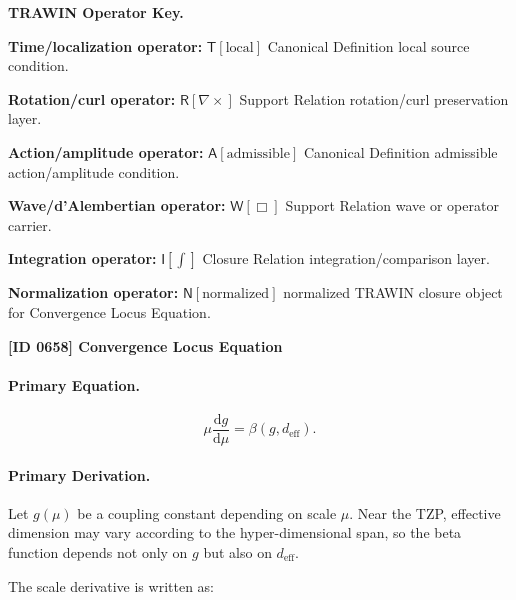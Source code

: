 \par\vspace{0.45\baselineskip}
\noindent\begin{minipage}[t]{\linewidth}
\begingroup
\small
\raggedright
\textbf{TRAWIN Operator Key.}\par
\noindent\textbf{Time/localization operator:} $\mathsf{T}\!\left[\mathrm{local}\right]$ Canonical Definition local source condition.\par
\noindent\textbf{Rotation/curl operator:} $\mathsf{R}\!\left[\nabla\times\right]$ Support Relation rotation/curl preservation layer.\par
\noindent\textbf{Action/amplitude operator:} $\mathsf{A}\!\left[\mathrm{admissible}\right]$ Canonical Definition admissible action/amplitude condition.\par
\noindent\textbf{Wave/d'Alembertian operator:} $\mathsf{W}\!\left[\Box\right]$ Support Relation wave or operator carrier.\par
\noindent\textbf{Integration operator:} $\mathsf{I}\!\left[\int\right]$ Closure Relation integration/comparison layer.\par
\noindent\textbf{Normalization operator:} $\mathsf{N}\!\left[\mathrm{normalized}\right]$ normalized TRAWIN closure object for Convergence Locus Equation.\par
\endgroup
\end{minipage}

\clearpage
\noindent\textbf{[ID 0658] Convergence Locus Equation}\par
\vspace{0.35em}
\paragraph{Primary Equation.}
\begin{equation}
\mu\frac{\mathrm{d}g}{\mathrm{d}\mu}
=
\beta(g,d_{\mathrm{eff}}).
\end{equation}

\paragraph{Primary Derivation.}
Let $g(\mu)$ be a coupling constant depending on scale $\mu$.  
Near the TZP, effective dimension may vary according to the hyper-dimensional span, so the beta function depends not only on $g$ but also on $d_{\mathrm{eff}}$.

The scale derivative is written as:

